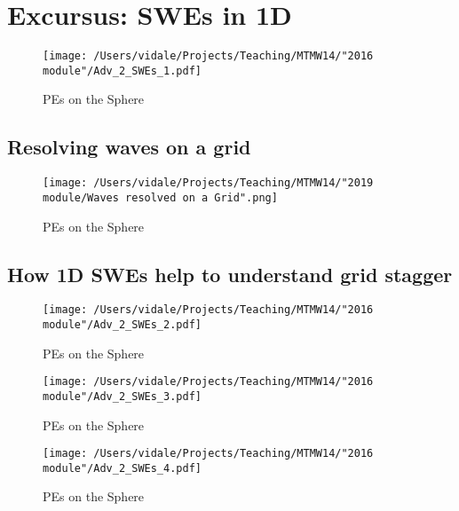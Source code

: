 \section{Excursus: SWEs in 1D}

\begin{figure}
\texttt{[image: /Users/vidale/Projects/Teaching/MTMW14/"2016 module"/Adv\_2\_SWEs\_1.pdf]}
\label{fig:Spherical-PEs1}
\caption{\label{fig:blue_rectangle} \tiny PEs on the Sphere}
\end{figure}

\subsection{Resolving waves on a grid} 
\begin{figure}
\texttt{[image: /Users/vidale/Projects/Teaching/MTMW14/"2019 module/Waves resolved on a Grid".png]}
\label{fig:Spherical-PEs2}
\caption{\label{fig:blue_rectangle} \tiny PEs on the Sphere}
\end{figure}

\subsection{How 1D SWEs help to understand grid stagger} 
\begin{figure}
\texttt{[image: /Users/vidale/Projects/Teaching/MTMW14/"2016 module"/Adv\_2\_SWEs\_2.pdf]}
\label{fig:Spherical-PEs2}
\caption{\label{fig:blue_rectangle} \tiny PEs on the Sphere}
\end{figure}

\begin{figure}
\texttt{[image: /Users/vidale/Projects/Teaching/MTMW14/"2016 module"/Adv\_2\_SWEs\_3.pdf]}
\label{fig:Spherical-PEs2}
\caption{\label{fig:blue_rectangle} \tiny PEs on the Sphere}
\end{figure}

\begin{figure}[h]
\texttt{[image: /Users/vidale/Projects/Teaching/MTMW14/"2016 module"/Adv\_2\_SWEs\_4.pdf]}
\label{fig:Spherical-PEs2}
\caption{\label{fig:blue_rectangle} \tiny PEs on the Sphere}
\end{figure}

